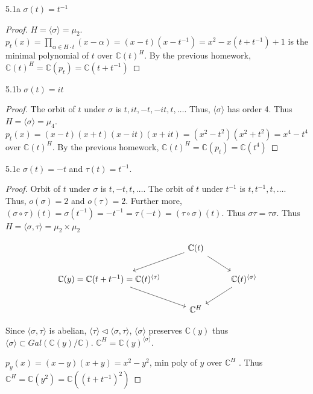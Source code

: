 \documentclass{article}
\newcommand{\C}{\mathbb{C}}
\newcommand{\angles}[1]{\langle #1 \rangle}
\begin{document}
\begin{PROB}{5.1a}\label{Problem 5.1a.}
    $\sigma(t) = t^{-1}$ 
\end{PROB}
\begin{proof}
    $H = \angles{\sigma} = \mu_2$. $p_t(x) = \prod_{\alpha \in H \cdot t}(x - \alpha) = (x - t)(x - t^{-1}) = x^2 - x(t + t^{-1}) + 1$ is the minimal polynomial of $t$ over $\C(t)^H$. By the previous homework, $\C(t)^H = \C(p_t) = \C(t + t^{-1})$     
\end{proof}
\begin{PROB}{5.1b}\label{Problem 5.1b.}
    $\sigma(t) = it$
\end{PROB}
\begin{proof}
    The orbit of $t$ under $\sigma$ is $t, it, -t, -it, t, \dots$. Thus, $\angles{\sigma}$ has order 4. Thus $H = \angles{\sigma} = \mu_4$. $p_t(x) = (x - t)(x + t)(x - it)(x + it) = (x^2 - t^2)(x^2 + t^2) = x^4 - t^4$ over $\C(t)^H$. By the previous homework, $\C(t)^H = \C(p_t) = \C(t^4)$   
\end{proof}
\begin{PROB}{5.1c}\label{Problem 5.1c.}
    $\sigma(t) = -t$ and $\tau(t) = t^{-1}$.   
\end{PROB}
\begin{proof}
    Orbit of $t$ under $\sigma$ is $t, -t, t, \dots$. The orbit of $t$ under $t^{-1}$ is $t, t^{-1}, t, \dots$. Thus, $o(\sigma) = 2$ and $o(\tau) = 2$. Further more, $(\sigma \circ \tau)(t) = \sigma(t^{-1}) = -t^{-1} = \tau(-t) = (\tau \circ \sigma)(t)$. Thus $\sigma \tau = \tau \sigma$. Thus $H = \angles{\sigma, \tau} = \mu_2 \times \mu_2$
    
    \[\begin{tikzcd}
        & {\C(t)} \\
        {\C(y) = \C(t+t^{-1}) = \C(t)^{\angles{\tau}}} && {\C(t)^{\angles{\sigma}}} \\
        & {\C^H}
        \arrow[from=1-2, to=2-1]
        \arrow[from=1-2, to=2-3]
        \arrow[from=2-1, to=3-2]
        \arrow[from=2-3, to=3-2]
    \end{tikzcd}\]

    Since $\angles{\sigma, \tau}$ is abelian,  $\angles{\tau} \triangleleft \angles{\sigma, \tau}$, $\angles{\sigma}$ preserves $\C(y)$ thus $\angles{\sigma} \subset Gal(\C(y) / \C)$. $\C^H = \C(y)^{\angles{\sigma}}$. 
    
    $p_{y}(x) = (x - y)(x + y) = x^2 - y^2$, min poly of $y$ over $\C^H$ . Thus $\C^H = \C(y^2) = \C((t + t^{-1})^2)$   
\end{proof}
\end{document}

